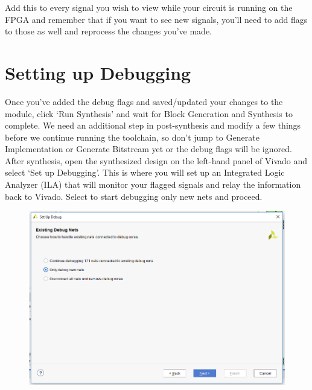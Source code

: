 \documentclass{article}
\begin{document}
Add this to every signal you wish to view while your circuit is
running on the FPGA and remember that if you want to see new signals,
you'll need to add flags to those as well and reprocess the changes
you've made.
	
\section{Setting up Debugging}

Once you've added the debug flags and saved/updated your changes to
the module, click `Run Synthesis' and wait for Block Generation and
Synthesis to complete.  We need an additional step in
post-synthesis and modify a
few things before we continue running the toolchain, so don't jump to
Generate Implementation or Generate Bitstream yet or the debug flags
will be ignored.  After
synthesis, open the synthesized design on the left-hand panel of
Vivado and select `Set up Debugging'.
This is where you will set up an Integrated Logic Analyzer (ILA) that will
monitor your flagged signals and relay the information back to Vivado.
Select to start debugging only new nets and proceed.
\begin{figure} [h!]
  \centering
  \includegraphics[scale=0.35]{figures/figure1.png}
\end{figure}	
	
\end{document}
